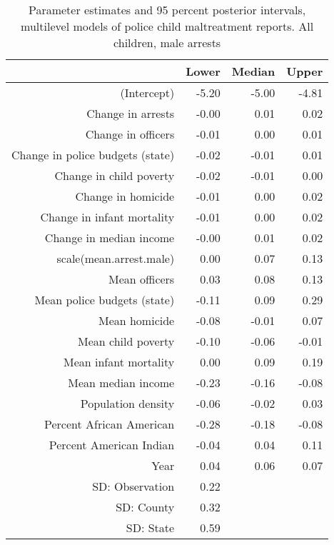 \begin{table}[ht]
\centering
\begin{tabular}{rrrr}
  \hline
 & Lower & Median & Upper \\ 
  \hline
(Intercept) & -5.20 & -5.00 & -4.81 \\ 
  Change in arrests & -0.00 & 0.01 & 0.02 \\ 
  Change in officers & -0.01 & 0.00 & 0.01 \\ 
  Change in police budgets (state) & -0.02 & -0.01 & 0.01 \\ 
  Change in child poverty & -0.02 & -0.01 & 0.00 \\ 
  Change in homicide & -0.01 & 0.00 & 0.02 \\ 
  Change in infant mortality & -0.01 & 0.00 & 0.02 \\ 
  Change in median income & -0.00 & 0.01 & 0.02 \\ 
  scale(mean.arrest.male) & 0.00 & 0.07 & 0.13 \\ 
  Mean officers & 0.03 & 0.08 & 0.13 \\ 
  Mean police budgets (state) & -0.11 & 0.09 & 0.29 \\ 
  Mean homicide & -0.08 & -0.01 & 0.07 \\ 
  Mean child poverty & -0.10 & -0.06 & -0.01 \\ 
  Mean infant mortality & 0.00 & 0.09 & 0.19 \\ 
  Mean median income & -0.23 & -0.16 & -0.08 \\ 
  Population density & -0.06 & -0.02 & 0.03 \\ 
  Percent African American & -0.28 & -0.18 & -0.08 \\ 
  Percent American Indian & -0.04 & 0.04 & 0.11 \\ 
  Year & 0.04 & 0.06 & 0.07 \\ 
  SD: Observation & 0.22 &  &  \\ 
  SD: County & 0.32 &  &  \\ 
  SD: State & 0.59 &  &  \\ 
   \hline
\end{tabular}
\caption{Parameter estimates and 95 percent posterior intervals, multilevel models of 
             police child maltreatment reports. All children, male arrests} 
\end{table}
